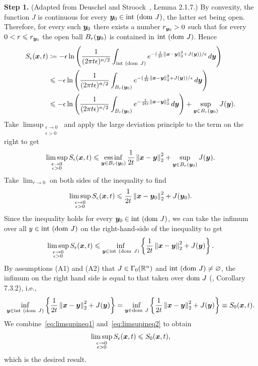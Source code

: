 \textbf{Step 1.} (Adapted from Deuschel and Stroock~\cite{deuschel2001large}, Lemma 2.1.7.) By convexity, the function $J$ is continuous for every $\boldsymbol{y}_{0}\in\mathrm{int~}(\mathrm{dom~} J)$, the latter set being open. Therefore, for every such $\boldsymbol{y}_{0}$ there exists a number $r_{\boldsymbol{y}_{0}}>0$ such that for every $0<r\leqslant r_{\boldsymbol{y}_{0}}$ the open ball $B_{r}(\boldsymbol{y}_{0})$ is contained in $\mathrm{int~}(\mathrm{dom~} J)$. Hence
\begin{align*}
S_{\epsilon}(\boldsymbol{x},t) & \coloneqq-\epsilon\ln\left(\frac{1}{(2\pi t\epsilon)^{n/2}}\int_{\mathrm{int~}(\mathrm{dom~} J)}e^{-(\frac{1}{2t}\left\Vert{\boldsymbol{x}-\boldsymbol{y}} \right\Vert_{2}^{2}+J(\boldsymbol{y}))/\epsilon}\mathop{}\!d\boldsymbol{y}\right)\\
 & \leqslant-\epsilon\ln\left(\frac{1}{(2\pi t\epsilon)^{n/2}}\int_{B_{r}(\boldsymbol{y}_{0})}e^{-(\frac{1}{2t}\left\Vert{\boldsymbol{x}-\boldsymbol{y}} \right\Vert_{2}^{2}+J(\boldsymbol{y}))/\epsilon}\mathop{}\!d\boldsymbol{y}\right)\\
 & \leqslant-\epsilon\ln\left(\frac{1}{(2\pi t\epsilon)^{n/2}}\int_{B_{r}(\boldsymbol{y}_{0})}e^{-\frac{1}{2t\epsilon}\left\Vert{\boldsymbol{x}-\boldsymbol{y}} \right\Vert_{2}^{2}}\mathop{}\!d\boldsymbol{y}\right)+\sup_{\boldsymbol{y}\in B_{r}(\boldsymbol{y}_{0})}J(\boldsymbol{y}).
\end{align*}
Take $\limsup_{\substack{\epsilon\to0\\ \epsilon>0}}$ and apply the large deviation principle to the term on the right to get
\[
\limsup_{\substack{\epsilon\to0\\\epsilon>0}}S_{\epsilon}(\boldsymbol{x},t)\leqslant\operatorname*{ess\,inf}_{\boldsymbol{y}\in B_{r}(\boldsymbol{y}_{0})}\frac{1}{2t}\left\Vert \boldsymbol{x}-\boldsymbol{y}\right\Vert _{2}^{2}+\sup_{\boldsymbol{y}\in B_{r}(\boldsymbol{y}_{0})}J(\boldsymbol{y}).
\]
Take $\lim_{r\to0}$ on both sides of the inequality to find
\[
\limsup_{\substack{\epsilon\to0\\\epsilon>0}}S_{\epsilon}(\boldsymbol{x},t)\leqslant\frac{1}{2t}\left\Vert \boldsymbol{x}-\boldsymbol{y}_{0}\right\Vert _{2}^{2}+J(\boldsymbol{y}_{0}).
\]
Since the inequality holds for every $\boldsymbol{y}_{0}\in\mathrm{int~}(\mathrm{dom~} J)$, we can take the infimum over all $y\in\mathrm{int~}(\mathrm{dom~} J)$ on the right-hand-side of the inequality to get
\begin{equation}\label{eq:limsupineq1}
\limsup_{\substack{\epsilon\to0\\\epsilon>0}}S_{\epsilon}(\boldsymbol{x},t)\leqslant\inf_{\boldsymbol{y}\in\mathrm{int~}(\mathrm{dom~} J)}\left\{ \frac{1}{2t}\left\Vert \boldsymbol{x}-\boldsymbol{y}\right\Vert _{2}^{2}+J(\boldsymbol{y})\right\}.
\end{equation}
By assumptions (A1) and (A2) that $J \in \Gamma_0(\mathbb{R}^n)$ and $\mathrm{int~}(\mathrm{dom~} J) \neq \varnothing$, the infimum on the right hand side is equal to that taken over $\mathrm{dom~} J$ (\citep{rockafellar1970convex}, Corollary 7.3.2), i.e.,
\begin{equation}\label{eq:limsupineq2}
\inf_{\boldsymbol{y}\in\mathrm{int~}(\mathrm{dom~} J)}\left\{ \frac{1}{2t}\left\Vert \boldsymbol{x}-\boldsymbol{y}\right\Vert _{2}^{2}+J(\boldsymbol{y})\right\}   =  \inf_{\boldsymbol{y}\in\mathrm{dom~} J}\left\{ \frac{1}{2t}\left\Vert \boldsymbol{x}-\boldsymbol{y}\right\Vert _{2}^{2}+J(\boldsymbol{y})\right\} \equiv S_0(\boldsymbol{x},t).
\end{equation}
We combine~\eqref{eq:limsupineq1} and~\eqref{eq:limsupineq2} to obtain 
\[\limsup_{\substack{\epsilon\to0\\\epsilon>0}}S_{\epsilon}(\boldsymbol{x},t)\leqslant S_0(\boldsymbol{x},t),
\]
which is the desired result.

